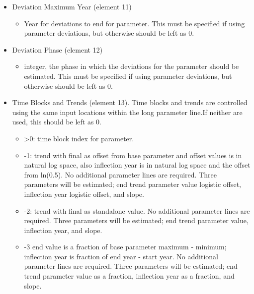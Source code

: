 {\begin{itemize}
\item Deviation  Maximum Year (element 11)
	\begin{itemize}
		\item Year for deviations to end for parameter. This must be specified if using parameter deviations, but otherwise should be left as 0.
	\end{itemize}
	
\item Deviation Phase (element 12)
	\begin{itemize}
		\item integer, the phase in which the deviations for the parameter should be estimated. This must be specified if using parameter deviations, but otherwise should be left as 0.
	\end{itemize}
	
\item Time Blocks and Trends (element 13). Time blocks and trends are controlled using the same input locations within the long parameter line.If neither are used, this should be left as 0.
	\begin{itemize}
		\item >0: time block index for parameter.
		\item -1: trend with final as offset from base parameter and offset values is in natural log space, also inflection year is in natural log space and the offset from ln(0.5). No additional parameter lines are required.  Three parameters will be estimated; end trend parameter value logistic offset, inflection year logistic offset, and slope.
		\item -2: trend with final as standalone value. No additional parameter lines are required. Three parameters will be estimated; end trend parameter value, inflection year, and slope.
		\item -3 end value is a fraction of base parameter maximum - minimum; inflection year is fraction of end year - start year. No additional parameter lines are required. Three parameters will be estimated; end trend parameter value as a fraction, inflection year as a fraction, and slope.
	\end{itemize}
	

\end{itemize}}
